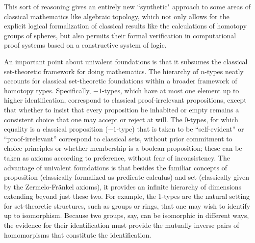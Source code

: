 \documentclass[11pt]{article}
\theoremstyle{remark}
\theoremstyle{definition}
\begin{document}
This sort of reasoning gives an entirely new ``synthetic" approach to some areas of classical mathematics like algebraic topology, which not only allows for the explicit logical formalization of classical results like the calculations of homotopy groups of spheres, but also permits their formal verification in computational proof systems based on a constructive system of logic.


An important point about univalent foundations is that it subsumes the classical set-theoretic framework for doing
mathematics.  The hierarchy of $n$-types neatly accounts for classical set-theoretic foundations within a broader
framework of homotopy types.  Specifically, $-1$-types, which have at most one element up to higher identification,
correspond to classical proof-irrelevant propositions, except that whether to insist that every proposition be inhabited
or empty remains a consistent choice that one may accept or reject at will.  The $0$-types, for which equality is a
classical proposition ($-1$-type) that is taken to be ``self-evident'' or ``proof-irrelevant'' correspond to classical
sets, without prior commitment to choice principles or whether membership is a boolean proposition; these can be taken
as axioms according to preference, without fear of inconsistency.  The advantage of univalent foundations is that
besides the familiar concepts of proposition (classically formalized as predicate calculus) and set (classically given
by the Zermelo-Fr\"{a}nkel axioms), it provides an infinite hierarchy of dimensions extending beyond just these two.
For example, the $1$-types are the natural setting for set-theoretic structures, such as groups or rings, that one may
wish to identify up to isomorphism.  Because two groups, say, can be isomorphic in different ways, the evidence for
their identification must provide the mutually inverse pairs of homomorpisms that constitute the identification.
\end{document}
